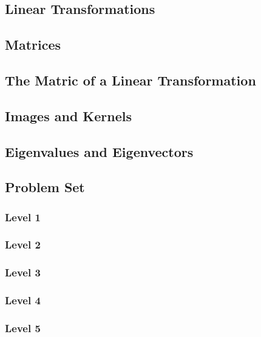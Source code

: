 \documentclass{article}
\begin{document}
\subsection{Linear Transformations}
\subsection{Matrices}
\subsection{The Matric of a Linear Transformation}
\subsection{Images and Kernels}
\subsection{Eigenvalues and Eigenvectors}
\subsection{Problem Set}
\subsubsection{Level 1}
\subsubsection{Level 2}
\subsubsection{Level 3}
\subsubsection{Level 4}
\subsubsection{Level 5}
\pagebreak
\end{document}
